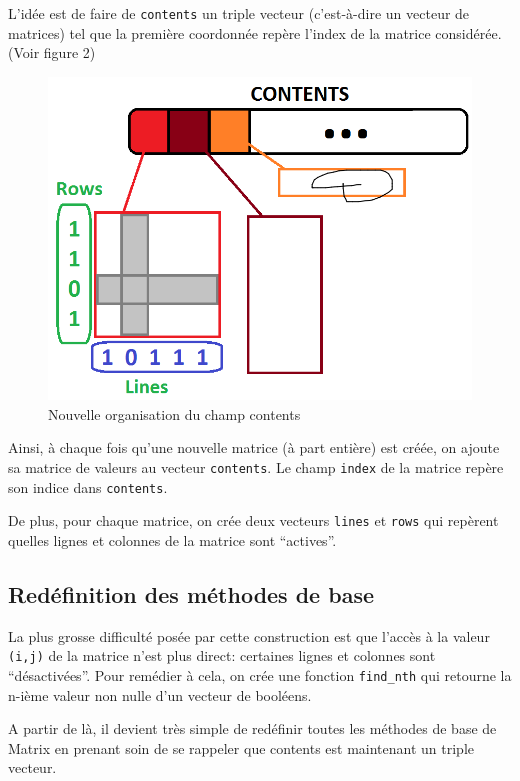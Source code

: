 \documentclass[a4paper,11pt]{article}
\begin{document}
L'idée est de faire de \texttt{contents} un triple vecteur (c'est-à-dire un vecteur de matrices) tel que la première coordonnée repère l'index de la matrice considérée. (Voir figure 2)

\begin{figure}
  \centering
  \includegraphics[scale=0.5]{matimpli.png}
  \caption{Nouvelle organisation du champ contents}
  \label{fig:phd}
\end{figure}

Ainsi, à chaque fois qu'une nouvelle matrice (à part entière) est créée, on ajoute sa matrice de valeurs au vecteur \texttt{contents}. Le champ \texttt{index} de la matrice repère son indice dans \texttt{contents}.

De plus, pour chaque matrice, on crée deux vecteurs \texttt{lines} et \texttt{rows} qui repèrent quelles lignes et colonnes de la matrice sont ``actives''.


\subsection{Redéfinition des méthodes de base}

La plus grosse difficulté posée par cette construction est que l'accès à la valeur \texttt{(i,j)} de la matrice n'est plus direct: certaines lignes et colonnes sont ``désactivées''. 
Pour remédier à cela, on crée une fonction \texttt{find\_nth} qui retourne la n-ième valeur non nulle d'un vecteur de booléens.

A partir de là, il devient très simple de redéfinir toutes les méthodes de base de Matrix en prenant soin de se rappeler que contents est maintenant un triple vecteur.
\end{document}
